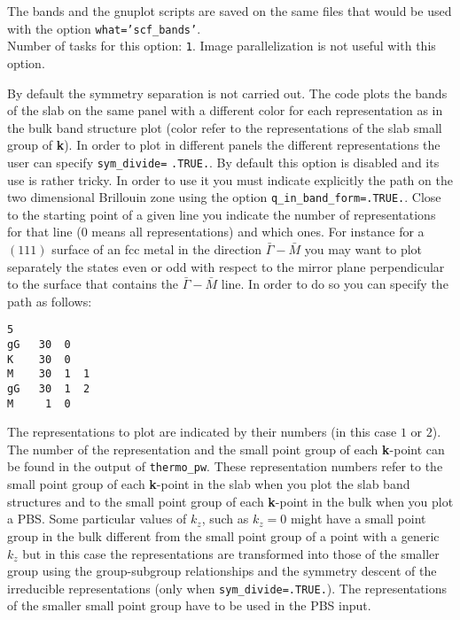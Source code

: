 \documentclass[12pt,a4paper]{article}
\begin{document}
The bands and the gnuplot scripts are saved on the same files that would
be used with the option \texttt{what='scf\_bands'}. \\
Number of tasks for this option: \texttt{1}. Image parallelization is
not useful with this option. 

By default the symmetry separation is not carried out. The code plots the
bands of the slab on the same panel with a different color for each 
representation as in the bulk band structure plot (color refer to the 
representations of the slab small group of {\bf k}). 
In order to plot in different panels the different representations
the user can specify \texttt{sym\_divide=} \texttt{.TRUE.}.
By default this option is disabled and its use is rather tricky.
In order to use it you must indicate explicitly the
path on the two dimensional Brillouin zone using the option
\texttt{q\_in\_band\_form=.TRUE.}. Close to the
starting point of a given line you indicate the number of 
representations for that line ($0$ means all representations) and which ones.
For instance for a $(111)$ surface of an fcc metal in the direction 
$\bar \Gamma-\bar M$ you may
want to plot separately the states even or odd with respect to the mirror
plane perpendicular to the surface that contains the $\bar \Gamma-\bar M$
line.
In order to do so you can specify the path as follows:
\begin{verbatim}
5
gG   30  0
K    30  0
M    30  1  1
gG   30  1  2
M     1  0
\end{verbatim}
The representations to plot are indicated by their numbers 
(in this case $1$ or $2$).
The number of the representation and the small point group of each 
{\bf k}-point can be found in the output of \texttt{thermo\_pw}.
These representation numbers refer to the small point group of each 
{\bf k}-point in the slab when you plot the slab band structures and 
to the small point group of each {\bf k}-point in the bulk when you plot 
a PBS. Some particular values of $k_z$, such as $k_z=0$
might have a small point group in the bulk different from the small
point group of a point with a generic $k_z$ but in this
case the representations are transformed into those of the smaller
group using the group-subgroup relationships and
the symmetry descent of the irreducible representations
(only when \texttt{sym\_divide=.TRUE.}). The representations of the
smaller small point group have to be used in the PBS input.
\end{document}
